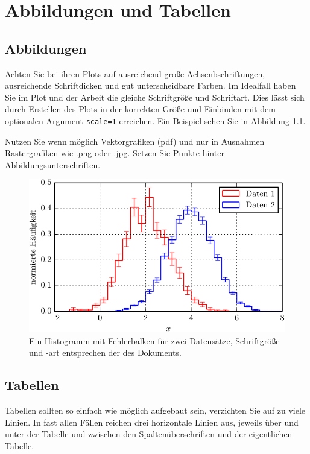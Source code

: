 \chapter{Abbildungen und Tabellen}

\section{Abbildungen}

Achten Sie bei ihren Plots auf ausreichend große Achsenbschriftungen, ausreichende Schriftdicken und gut unterscheidbare Farben.
Im Idealfall haben Sie im Plot und der Arbeit die gleiche Schriftgröße und Schriftart.
Dies lässt sich durch Erstellen des Plots in der korrekten Größe und Einbinden mit dem optionalen Argument \texttt{scale=1} erreichen. Ein Beispiel sehen Sie in Abbildung \ref{fig:bsp}.

Nutzen Sie wenn möglich Vektorgrafiken (pdf) und nur in Ausnahmen Rastergrafiken wie .png oder .jpg.
Setzen Sie Punkte hinter Abbildungsunterschriften.

\begin{figure}
    \centering
    \includegraphics[scale=1]{./Plots/Histogramm.pdf}
    \caption{Ein Histogramm mit Fehlerbalken für zwei Datensätze, Schriftgröße und -art entsprechen der des Dokuments.}
    \label{fig:bsp}
\end{figure}

\section{Tabellen}

Tabellen sollten so einfach wie möglich aufgebaut sein, verzichten Sie auf zu viele Linien. In fast allen Fällen reichen drei horizontale Linien aus, jeweils über und unter der Tabelle und zwischen den Spaltenüberschriften und der eigentlichen Tabelle.

